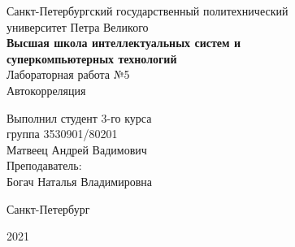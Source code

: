 \documentclass[a4paper]{article}
\begin{document}
    \begin{center}
        \begin{center}
        \hfill \break
        \normalsize{Санкт-Петербургский государственный политехнический}\\
        \normalsize{университет Петра Великого}\\
        \hfill \break
        \normalsize{\textbf{Высшая школа интеллектуальных систем и}}\\ 
        \normalsize{\textbf{суперкомпьютерных технологий}}\\ 
        \hfill \break
        \hfill \break
        \hfill \break
        \normalsize{Лабораторная работа №5}\\
        \hfill \break
        \hfill \break
        \normalsize{\LARGE Автокорреляция}\\
        \end{center}
        \hfill \break
        \hfill \break
        \hfill \break
        \hfill \break
        \hfill \break
        \hfill \break
        \hfill \break
        \hfill \break
        \hfill \break
        \hfill \break
        \begin{flushright}
            \normalsize{Выполнил студент 3-го курса}\\
            \normalsize{группа 3530901/80201}\\
            \normalsize{Матвеец Андрей Вадимович}\\
            \hfill \break
            \normalsize{Преподаватель:}\\
            \normalsize{Богач Наталья Владимировна}\\
        \end{flushright}
        \hfill \break
        \hfill \break
        \hfill \break
        \hfill \break
        \begin{center} Санкт-Петербург\end{center}
        \begin{center}2021\end{center} 
        \thispagestyle{empty}
    \end{center}
    
    \newpage
        \tableofcontents
    
    \newpage
         \listoffigures
    
    \newpage
         \lstlistoflistings   
     
\end{document}
